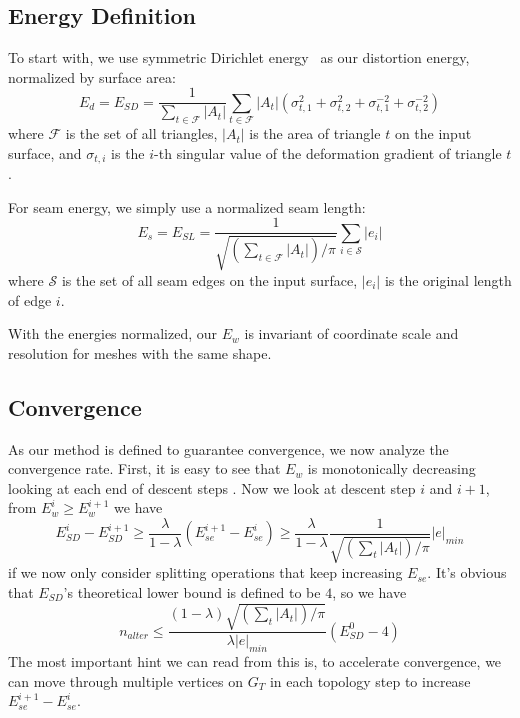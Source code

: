 \subsection{Energy Definition}

To start with, we use symmetric Dirichlet energy~\cite{Smith2015Bijective} as our distortion energy, normalized by surface area:
\[ E_d = E_{SD} = \frac{1}{\sum_{t\in\mathcal{F}} |A_t|} \sum_{t\in\mathcal{F}} |A_t|(\sigma_{t,1}^2 + \sigma_{t,2}^2 + \sigma_{t,1}^{-2} + \sigma_{t,2}^{-2}) \]
where $\mathcal{F}$ is the set of all triangles, $|A_t|$ is the area of triangle $t$ on the input surface, and $\sigma_{t,i}$ is the $i$-th singular value of the deformation gradient of triangle $t$.

For seam energy, we simply use a normalized seam length:
\[ E_s = E_{SL} = \frac{1}{\sqrt{(\sum_{t\in\mathcal{F}} |A_t|)/\pi}} \sum_{i \in \mathcal{S}} |e_i| \]
where $\mathcal{S}$ is the set of all seam edges on the input surface, $|e_i|$ is the original length of edge $i$.

With the energies normalized, our $E_w$ is invariant of coordinate scale and resolution for meshes with the same shape.





\subsection{Convergence}
\label{sec:convergence}

As our method is defined to guarantee convergence, we now analyze the convergence rate. First, it is easy to see that $E_w$ is monotonically decreasing looking at each end of descent steps . Now we look at descent step $i$ and $i+1$, from $E^i_w \geq E^{i+1}_w$ we have
\[ E^i_{SD} - E^{i+1}_{SD} \geq \frac{\lambda}{1-\lambda} (E^{i+1}_{se} - E^i_{se}) \geq \frac{\lambda}{1-\lambda} \frac{1}{\sqrt{(\sum_t |A_t|)/\pi}} |e|_{min} \]
if we now only consider splitting operations that keep increasing $E_{se}$. It's obvious that $E_{SD}$'s theoretical lower bound is defined to be $4$, so we have
\[ n_{alter} \leq \frac{(1-\lambda)\sqrt{(\sum_t |A_t|)/\pi}}{\lambda|e|_{min}} (E^0_{SD} - 4) \]
The most important hint we can read from this is, to accelerate convergence, we can move through multiple vertices on $G_T$ in each topology step to increase $E^{i+1}_{se} - E^i_{se}$.

